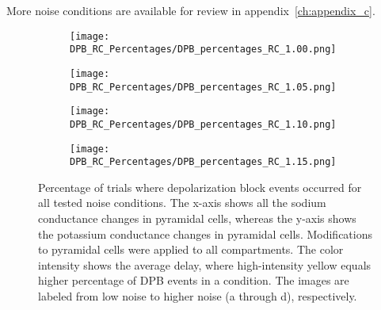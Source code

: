 \noindent More noise conditions are available for review in appendix~\ref{ch:appendix_c}.

\begin{figure}[htbp]
    \centering
    \begin{subfigure}{0.48\textwidth}
        \texttt{[image: DPB\_RC\_Percentages/DPB\_percentages\_RC\_1.00.png]}
        \caption{} %
    \end{subfigure}\hfill
    \begin{subfigure}{0.48\textwidth}
        \texttt{[image: DPB\_RC\_Percentages/DPB\_percentages\_RC\_1.05.png]}
        \caption{} %
    \end{subfigure}

    \bigskip %

    \begin{subfigure}{0.48\textwidth}
        \texttt{[image: DPB\_RC\_Percentages/DPB\_percentages\_RC\_1.10.png]}
        \caption{} %
    \end{subfigure}\hfill
    \begin{subfigure}{0.48\textwidth}
        \texttt{[image: DPB\_RC\_Percentages/DPB\_percentages\_RC\_1.15.png]}
        \caption{} %
    \end{subfigure}

    \caption[RC DPB percentage matrices (all)]{Percentage of trials where depolarization block events occurred for all tested noise conditions.
        The x-axis shows all the sodium conductance changes in pyramidal cells, whereas the y-axis shows the potassium conductance changes in pyramidal cells.
        Modifications to pyramidal cells were applied to all compartments.
        The color intensity shows the average delay, where high-intensity yellow equals higher percentage of DPB events in a condition.
        The images are labeled from low noise to higher noise (a through d), respectively.}\label{fig:rc_dpb_percentage_matrices}
\end{figure}